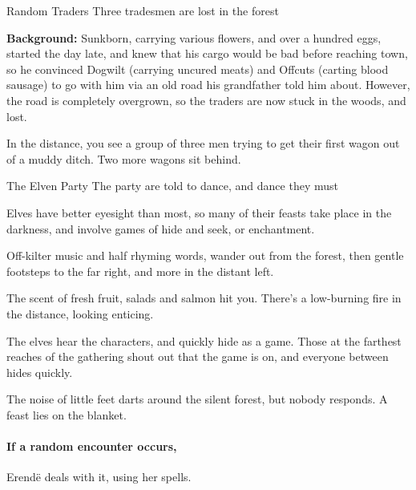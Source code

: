 {Random Traders}%
{Three tradesmen are lost in the forest}%

\textbf{Background:}
Sunkborn, carrying various flowers, and over a hundred eggs, started the day late, and knew that his cargo would be bad before reaching \gls{town}, so he convinced Dogwilt (carrying uncured meats) and Offcuts (carting blood sausage) to go with him via an old road his grandfather told him about.
However, the road is completely overgrown, so the traders are now stuck in the woods, and lost.

\begin{boxtext}
  In the distance, you see a group of three men trying to get their first wagon out of a muddy ditch.
  Two more wagons sit behind.
\end{boxtext}



{The Elven Party}%
{The party are told to dance, and dance they must}%

Elves have better eyesight than most, so many of their feasts take place in the darkness, and involve games of hide and seek, or enchantment.

\begin{boxtext}
  Off-kilter music and half rhyming words, wander out from the forest, then gentle footsteps to the far right, and more in the distant left.

  The scent of fresh fruit, salads and salmon hit you.  There's a low-burning fire in the distance, looking enticing.
\end{boxtext}

The elves hear the characters, and quickly hide as a game.  Those at the farthest reaches of the gathering shout out that the game is on, and everyone between hides quickly.

\begin{boxtext}
  The noise of little feet darts around the silent forest, but nobody responds.
  A feast lies on the blanket.
\end{boxtext}

\paragraph{If a random encounter occurs,}
Erend\"e deals with it, using her spells.

